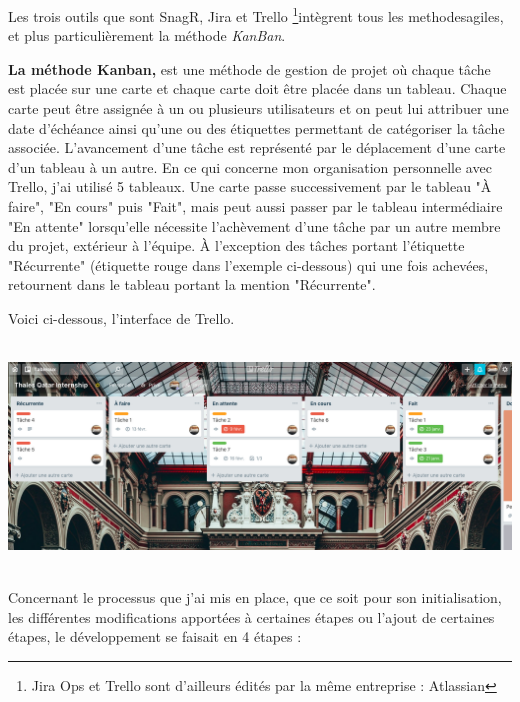 Les trois outils que sont SnagR, Jira et Trello \footnote{Jira Ops et Trello sont d'ailleurs édités par la même entreprise : Atlassian}intègrent tous les \gls{methodesagiles}, et plus particulièrement la méthode \textit{KanBan}.

\textbf{La méthode Kanban,} est une méthode de gestion de projet où chaque tâche est placée sur une carte et chaque carte doit être placée dans un tableau. Chaque carte peut être assignée à un ou plusieurs utilisateurs et on peut lui attribuer une date d'échéance ainsi qu'une ou des étiquettes permettant de catégoriser la tâche associée. L'avancement d'une tâche est représenté par le déplacement d'une carte d'un tableau à un autre.
En ce qui concerne mon organisation personnelle avec Trello, j'ai utilisé 5 tableaux. Une carte passe successivement par le tableau "À faire", "En cours" puis "Fait", mais peut aussi passer par le tableau intermédiaire "En attente" lorsqu'elle nécessite l'achèvement d'une tâche par un autre membre du projet, extérieur à l'équipe. À l'exception des tâches portant l'étiquette "Récurrente" (étiquette rouge dans l'exemple ci-dessous) qui une fois achevées, retournent dans le tableau portant la mention "Récurrente".

Voici ci-dessous, l'interface de Trello.

\begin{center}
\includegraphics[height=6cm]{ressources/images/figures/Trello.png}
\end{center}

Concernant le processus que j'ai mis en place, que ce soit pour son initialisation, les différentes modifications apportées à certaines étapes ou l'ajout de certaines étapes, le développement se faisait en 4 étapes :

